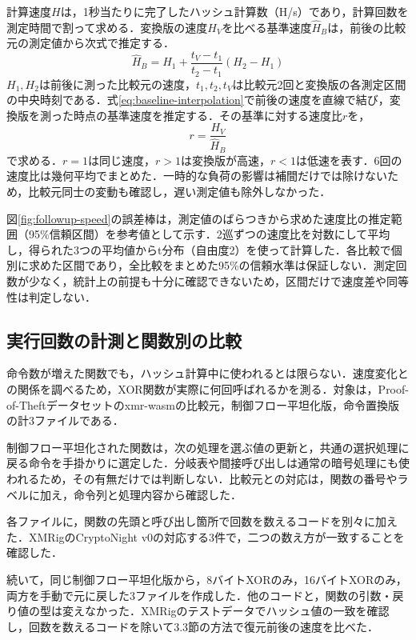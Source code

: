 \documentclass[submit,techrep]{ipsj}
\begin{document}
計算速度$H$は，1秒当たりに完了したハッシュ計算数（H/s）であり，計算回数を測定時間で割って求める．変換版の速度$H_V$を比べる基準速度$\widehat H_B$は，前後の比較元の測定値から次式で推定する．
\begin{equation}
\widehat H_B=H_1+\frac{t_V-t_1}{t_2-t_1}(H_2-H_1)
\label{eq:baseline-interpolation}
\end{equation}
$H_1,H_2$は前後に測った比較元の速度，$t_1,t_2,t_V$は比較元2回と変換版の各測定区間の中央時刻である．式\ref{eq:baseline-interpolation}で前後の速度を直線で結び，変換版を測った時点の基準速度を推定する．その基準に対する速度比$r$を，
\begin{equation}
r=\frac{H_V}{\widehat H_B}
\label{eq:speed-ratio}
\end{equation}
で求める．$r=1$は同じ速度，$r>1$は変換版が高速，$r<1$は低速を表す．6回の速度比は幾何平均でまとめた．一時的な負荷の影響は補間だけでは除けないため，比較元同士の変動も確認し，遅い測定値も除外しなかった．

図\ref{fig:followup-speed}の誤差棒は，測定値のばらつきから求めた速度比の推定範囲（95\%信頼区間）を参考値として示す．2巡ずつの速度比を対数にして平均し，得られた3つの平均値からt分布（自由度2）を使って計算した．各比較で個別に求めた区間であり，全比較をまとめた95\%の信頼水準は保証しない．測定回数が少なく，統計上の前提も十分に確認できないため，区間だけで速度差や同等性は判定しない．

\subsection{実行回数の計測と関数別の比較}
命令数が増えた関数でも，ハッシュ計算中に使われるとは限らない．速度変化との関係を調べるため，XOR関数が実際に何回呼ばれるかを測る．対象は，Proof-of-Theftデータセットのxmr-wasmの比較元，制御フロー平坦化版，命令置換版の計3ファイルである．

制御フロー平坦化された関数は，次の処理を選ぶ値の更新と，共通の選択処理に戻る命令を手掛かりに選定した．分岐表や間接呼び出しは通常の暗号処理にも使われるため，その有無だけでは判断しない．比較元との対応は，関数の番号やラベルに加え，命令列と処理内容から確認した．

各ファイルに，関数の先頭と呼び出し箇所で回数を数えるコードを別々に加えた．XMRigのCryptoNight v0の対応する3件で，二つの数え方が一致することを確認した．

続いて，同じ制御フロー平坦化版から，8バイトXORのみ，16バイトXORのみ，両方を手動で元に戻した3ファイルを作成した．他のコードと，関数の引数・戻り値の型は変えなかった．XMRigのテストデータでハッシュ値の一致を確認し，回数を数えるコードを除いて3.3節の方法で復元前後の速度を比べた．
\end{document}
